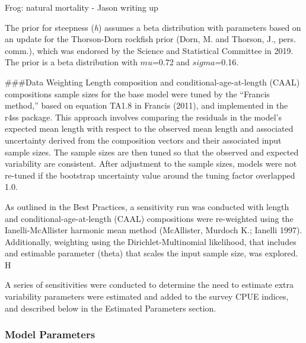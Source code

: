 \documentclass[11pt,
  english,
  a4paper,
]{article}
\begin{document}
\leavevmode\tagmcend\tagstructend

Frog: natural mortality - Jason writing up

The prior for steepness (\emph{h}) assumes a beta distribution with parameters based on an update for the Thorson-Dorn rockfish prior (Dorn, M. and Thorson, J., pers. comm.), which was endorsed by the Science and Statistical Committee in 2019. The prior is a beta distribution with {\(mu\)\leavevmode\tagmcend\tagstructend}=0.72 and {\(sigma\)\leavevmode\tagmcend\tagstructend}=0.16.

\#\#\#Data Weighting Length composition and conditional-age-at-length (CAAL) compositions sample sizes for the base model were tuned by the ``Francis method,'' based on equation TA1.8 in Francis {(2011)\leavevmode\tagmcend\tagstructend}, and implemented in the r4ss package. This approach involves comparing the residuals in the model's expected mean length with respect to the observed mean length and associated uncertainty derived from the composition vectors and their associated input sample sizes. The sample sizes are then tuned so that the observed and expected variability are consistent. After adjustment to the sample sizes, models were not re-tuned if the bootstrap uncertainty value around the tuning factor overlapped 1.0.

As outlined in the Best Practices, a sensitivity run was conducted with length and conditional-age-at-length (CAAL) compositions were re-weighted using the Ianelli-McAllister harmonic mean method {(McAllister, Murdoch K.; Ianelli 1997)\leavevmode\tagmcend\tagstructend}. Additionally, weighting using the Dirichlet-Multinomial likelihood, that includes and estimable parameter (theta) that scales the input sample size, was explored. H

A series of sensitivities were conducted to determine the need to estimate extra variability parameters were estimated and added to the survey CPUE indices, and described below in the Estimated Parameters section.


\hypertarget{model-parameters}{%
\subsubsection{Model Parameters}\label{model-parameters}}
\end{document}
